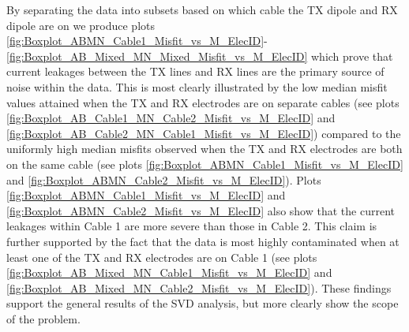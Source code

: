 \documentclass[final,authoryear,5p,times,twocolumn]{elsarticle}
\begin{document}
By separating the data into subsets based on which cable the TX dipole and RX dipole are on we produce plots \ref{fig:Boxplot_ABMN_Cable1_Misfit_vs_M_ElecID}-\ref{fig:Boxplot_AB_Mixed_MN_Mixed_Misfit_vs_M_ElecID} which prove that current leakages between the TX lines and RX lines are the primary source of noise within the data. This is most clearly illustrated by the low median misfit values attained when the TX and RX electrodes are on separate cables (see plots \ref{fig:Boxplot_AB_Cable1_MN_Cable2_Misfit_vs_M_ElecID} and \ref{fig:Boxplot_AB_Cable2_MN_Cable1_Misfit_vs_M_ElecID}) compared to the uniformly high median misfits observed when the TX and RX electrodes are both on the same cable (see plots \ref{fig:Boxplot_ABMN_Cable1_Misfit_vs_M_ElecID} and \ref{fig:Boxplot_ABMN_Cable2_Misfit_vs_M_ElecID}). Plots \ref{fig:Boxplot_ABMN_Cable1_Misfit_vs_M_ElecID} and \ref{fig:Boxplot_ABMN_Cable2_Misfit_vs_M_ElecID} also show that the current leakages within Cable 1 are more severe than those in Cable 2. This claim is further supported by the fact that the data is most highly contaminated when at least one of the TX and RX electrodes are on Cable 1 (see plots \ref{fig:Boxplot_AB_Mixed_MN_Cable1_Misfit_vs_M_ElecID} and \ref{fig:Boxplot_AB_Mixed_MN_Cable2_Misfit_vs_M_ElecID}). These findings support the general results of the SVD analysis, but more clearly show the scope of the problem.
\end{document}
